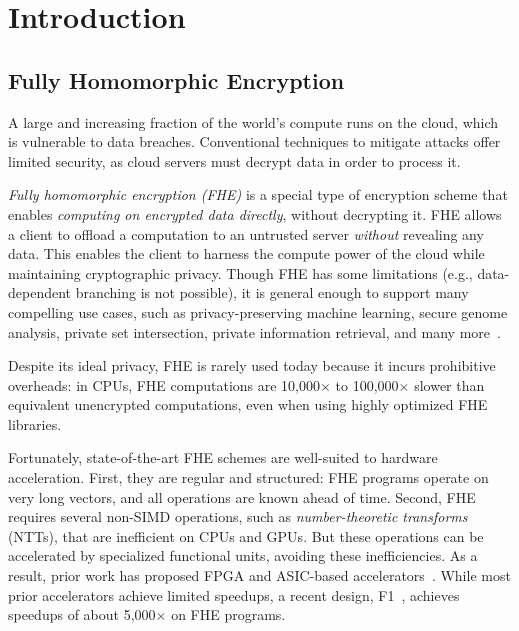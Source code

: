 \section{Introduction}

\subsection{Fully Homomorphic Encryption}


A large and increasing fraction of the world's compute runs on the cloud, which
is vulnerable to data breaches. Conventional techniques to mitigate attacks
offer limited security, as cloud servers must decrypt data in order to process
it.

\emph{Fully homomorphic encryption (FHE)} is a special type of encryption
scheme that enables \emph{computing on encrypted data directly}, without
decrypting it. FHE allows a client to offload a computation to an untrusted
server \emph{without} revealing any data. This enables
the client to harness the compute power of the cloud while maintaining
cryptographic privacy. Though FHE has some limitations (e.g., data-dependent
branching is not possible), it is general enough to support many compelling use
cases, such as privacy-preserving machine learning, secure genome analysis,
private set intersection, private information retrieval, and many
more~\cite{kim2020semi,gilad:icml16:cryptonets,han:aaai19:logistic,han:iacr18:efficient,juvekar2018gazelle,DBLP:conf/ccs/ChenLR17,DBLP:conf/tcc/GentryH19}. 

Despite its ideal privacy, FHE is rarely used today because it incurs
prohibitive overheads: in CPUs, FHE computations are 10,000$\times$ to
100,000$\times$ slower than equivalent unencrypted computations, even when
using highly optimized FHE libraries.

Fortunately, state-of-the-art FHE schemes are well-suited to hardware
acceleration. First, they are regular and structured: FHE programs operate on
very long vectors, and all operations are known ahead of time. Second, FHE
requires several non-SIMD operations, such as \emph{number-theoretic
transforms} (NTTs), that are inefficient on CPUs and GPUs. But these operations
can be accelerated by specialized functional units, avoiding these
inefficiencies. As a result, prior work has proposed FPGA and ASIC-based
accelerators~\cite{riazi:asplos20:heax,cousins:hpec12:sipher-fpga,cousins:tetc17:fpga-he,turan:tc20:heaws,cousins:hpec14:fpga-he,
roy:hpca19:fpga-he,feldmann:micro21:f1}. While most prior accelerators achieve
limited speedups, a recent design, F1~\cite{feldmann:micro21:f1}, achieves
speedups of
about 5,000$\times$ on FHE programs.

